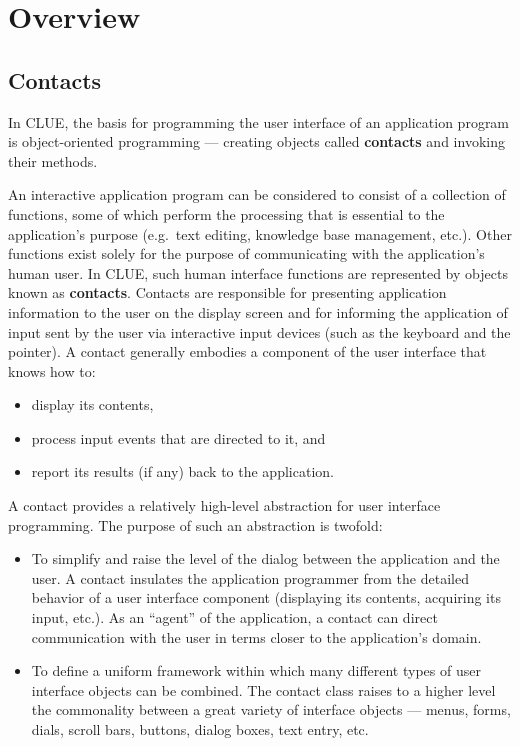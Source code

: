 \section{Overview}
\subsection{Contacts}
%
In CLUE, the basis for programming the user interface of an application
program is object-oriented programming --- creating objects called
{\bf contacts} and invoking their methods.  

An interactive application program can be considered to consist of a collection
of functions,  some of which perform the processing that is essential
to the application's purpose (e.g.\ text editing, knowledge base management,
etc.).  Other functions exist solely for the purpose of communicating with
the application's human user.  In CLUE, such human interface functions are
represented by objects known as {\bf contacts}.  Contacts are responsible for
presenting application information to the user on the display screen and for
informing the application of input sent by the user via interactive input
devices (such as the keyboard and the pointer).  A contact generally embodies a
component of the user interface that knows how to:
\begin{itemize}
\item  display its contents,
\item process input events that are directed to it, and 
\item report its results (if any) back to the application.
\end{itemize}

A contact provides a relatively high-level abstraction for user interface
programming.  The purpose of such an abstraction is twofold: 
\begin{itemize}	
\item To simplify and raise the level of the dialog between the application and
the user. A contact insulates the application programmer from the detailed behavior
of a user interface component (displaying its contents, acquiring its input,
etc.). As an ``agent'' of the application, a contact can direct 
communication with the user in terms closer to the application's domain.

\item To define a uniform framework within which many different types of user
interface objects can be combined. The contact class raises to a higher level the
commonality between a great variety of interface objects --- menus, forms,
dials, scroll bars, buttons, dialog boxes, text entry, etc.
\end{itemize}

